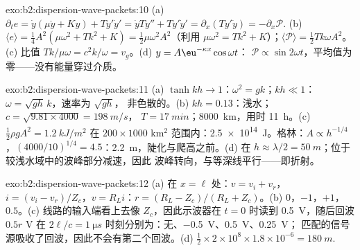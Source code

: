 \begin{solution}{exo:b2:dispersion-wave-packets:10}
(a) $\partial_te = \dot y(\mu\ddot y + Ky) + Ty'\dot y' = \dot yTy'' + Ty'\dot y' = \partial_x
(Ty'\dot y) = -\partial_x\mathcal P$. (b) $\langle e\rangle = \tfrac14A^2(\mu\omega^2 + Tk^2 + K) =
\tfrac12\mu\omega^2A^2$（利用 $\mu\omega^2 = Tk^2 + K$）；$\langle\mathcal P\rangle = \tfrac12Tk\omega
A^2$。(c) 比值 $Tk/\mu\omega = c^2k/\omega = v_g$。(d) $y = A\eu^{-\kappa x}\cos\omega t$：
$\mathcal P \propto \sin2\omega t$，平均值为零——没有能量穿过介质。
\end{solution}

\begin{solution}{exo:b2:dispersion-wave-packets:11}
(a) $\tanh kh \to 1$：$\omega^2 = gk$；$kh \ll 1$：$\omega = \sqrt{gh}\,k$，速率为 $\sqrt{gh}$，
非色散的。(b) $kh = 0.13$：浅水；$c = \sqrt{9.81 \times 4000} = \qty{198}{m/s}$，
$T = \qty{17}{min}$；\qty{8000}{km}，用时 \qty{11}{h}。(c) $\tfrac12\rho gA^2 = \qty{1.2}{kJ/m^2}$
在 $200 \times 1000$ km$^2$ 范围内：\qty{2.5e14}{J}。格林：$A \propto h^{-1/4}$，$(4000/10)^{1/4}
= 4.5$：\qty{2.2}{m}，陡化与爬高之前。(d) 在 $h \approx \lambda/2 =
\qty{50}{m}$；位于较浅水域中的波峰部分减速，因此
波峰转向，与等深线平行——即折射。
\end{solution}

\begin{solution}{exo:b2:dispersion-wave-packets:12}
(a) 在 $x = \ell$ 处：$v = v_i + v_r$，$i = (v_i - v_r)/Z_c$，$v = R_Li$：$r = (R_L -
Z_c)/(R_L + Z_c)$。(b) $0$，$-1$，$+1$，$0.5$。(c) 线路的输入端看上去像
$Z_c$，因此示波器在 $t = 0$ 时读到 \qty{0.5}{V}，随后回波 $0.5r$ V 在
$2\ell/c = \qty{1}{\micro s}$ 时刻分别为：无、\qty{-0.5}{V}、\qty{+0.5}{V}、\qty{+0.25}{V}；
匹配的信号源吸收了回波，因此不会有第二个回波。(d)
$\tfrac12 \times 2 \times 10^8 \times 1.8 \times 10^{-6} = \qty{180}{m}$.
\end{solution}

